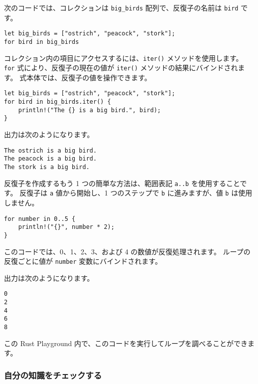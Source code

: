次のコードでは、コレクションは \texttt{big\_birds} 配列で、反復子の名前は \texttt{bird} です。





\begin{lstlisting}[numbers=none]
let big_birds = ["ostrich", "peacock", "stork"];
for bird in big_birds
\end{lstlisting}

コレクション内の項目にアクセスするには、\texttt{iter()} メソッドを使用します。 \texttt{for} 式により、反復子の現在の値が \texttt{iter()} メソッドの結果にバインドされます。 式本体では、反復子の値を操作できます。



\begin{lstlisting}[numbers=none]
let big_birds = ["ostrich", "peacock", "stork"];
for bird in big_birds.iter() {
    println!("The {} is a big bird.", bird);
}
\end{lstlisting}

出力は次のようになります。

\begin{lstlisting}[numbers=none]
The ostrich is a big bird.
The peacock is a big bird.
The stork is a big bird.
\end{lstlisting}

反復子を作成するもう 1 つの簡単な方法は、範囲表記 \texttt{a..b} を使用することです。 反復子は \texttt{a} 値から開始し、1 つのステップで \texttt{b} に進みますが、値 \texttt{b} は使用しません。

\begin{lstlisting}[numbers=none]
for number in 0..5 {
    println!("{}", number * 2);
}
\end{lstlisting}

このコードでは、0、1、2、3、および 4 の数値が反復処理されます。 ループの反復ごとに値が \texttt{number} 変数にバインドされます。

出力は次のようになります。

\begin{lstlisting}[numbers=none]
0
2
4
6
8
\end{lstlisting}

この Rust Playground 内で、このコードを実行してループを調べることができます。

\subsubsection{自分の知識をチェックする}

